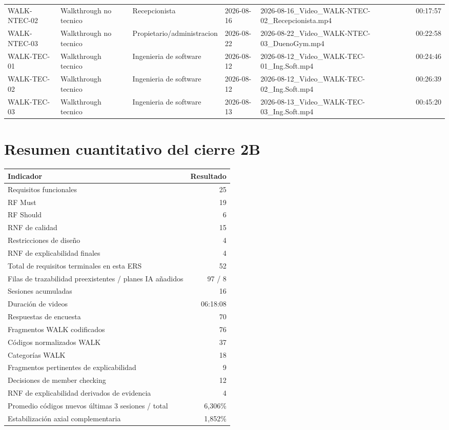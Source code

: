 \documentclass[11pt,a4paper,twoside]{article}
\begin{document}
\begin{landscape}
\begin{longtable}{p{2.2cm}p{3.2cm}p{4.2cm}p{2.7cm}p{7.8cm}p{2.2cm}}
WALK-NTEC-02 & Walkthrough no tecnico & Recepcionista & 2026-08-16 & 2026-08-16\_Video\_WALK-NTEC-02\_Recepcionista.mp4 & 00:17:57 \\
WALK-NTEC-03 & Walkthrough no tecnico & Propietario/administracion & 2026-08-22 & 2026-08-22\_Video\_WALK-NTEC-03\_DuenoGym.mp4 & 00:22:58 \\
WALK-TEC-01 & Walkthrough tecnico & Ingenieria de software & 2026-08-12 & 2026-08-12\_Video\_WALK-TEC-01\_Ing.Soft.mp4 & 00:24:46 \\
WALK-TEC-02 & Walkthrough tecnico & Ingenieria de software & 2026-08-12 & 2026-08-12\_Video\_WALK-TEC-02\_Ing.Soft.mp4 & 00:26:39 \\
WALK-TEC-03 & Walkthrough tecnico & Ingenieria de software & 2026-08-13 & 2026-08-13\_Video\_WALK-TEC-03\_Ing.Soft.mp4 & 00:45:20 \\
\bottomrule\end{longtable}\normalsize
\end{landscape}

\section{Resumen cuantitativo del cierre 2B}
\begin{tabularx}{\textwidth}{Xr}\toprule
Indicador & Resultado \\ \midrule
Requisitos funcionales & 25 \\
RF Must & 19 \\
RF Should & 6 \\
RNF de calidad & 15 \\
Restricciones de diseño & 4 \\
RNF de explicabilidad finales & 4 \\
Total de requisitos terminales en esta ERS & 52 \\
Filas de trazabilidad preexistentes / planes IA añadidos & 97 / 8 \\
Sesiones acumuladas & 16 \\
Duración de videos & 06:18:08 \\
Respuestas de encuesta & 70 \\
Fragmentos WALK codificados & 76 \\
Códigos normalizados WALK & 37 \\
Categorías WALK & 18 \\
Fragmentos pertinentes de explicabilidad & 9 \\
Decisiones de member checking & 12 \\
RNF de explicabilidad derivados de evidencia & 4 \\
Promedio códigos nuevos últimas 3 sesiones / total & 6,306\% \\
Estabilización axial complementaria & 1,852\% \\
\bottomrule\end{tabularx}
\end{document}
